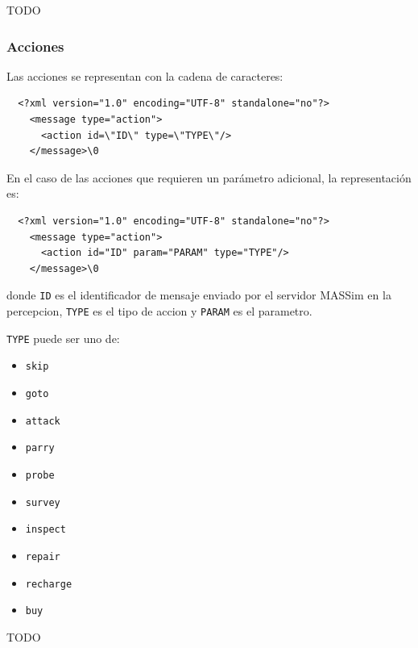 TODO

\subsubsection{Acciones}
 \label{subsub:acciones}

  Las acciones se representan con la cadena de caracteres:
  
  \begin{verbatim}
  <?xml version="1.0" encoding="UTF-8" standalone="no"?>
    <message type="action">
      <action id=\"ID\" type=\"TYPE\"/>
    </message>\0
  \end{verbatim}
  
  En el caso de las acciones que requieren un parámetro adicional, la
  representación es:
  
  \begin{verbatim}
  <?xml version="1.0" encoding="UTF-8" standalone="no"?>
    <message type="action">
      <action id="ID" param="PARAM" type="TYPE"/>
    </message>\0
  \end{verbatim}
  
  donde {\tt ID} es el identificador de mensaje enviado por el servidor
  MASSim en la percepcion, {\tt TYPE} es el tipo de accion y {\tt PARAM}
  es el parametro. 
  
  {\tt TYPE} puede ser uno de:
  
  \begin{itemize}
  \item \tt{skip}
  \item \tt{goto}
  \item \tt{attack}
  \item \tt{parry}
  \item \tt{probe}
  \item \tt{survey}
  \item \tt{inspect}
  \item \tt{repair}
  \item \tt{recharge}
  \item \tt{buy}
  \end{itemize}

 TODO

